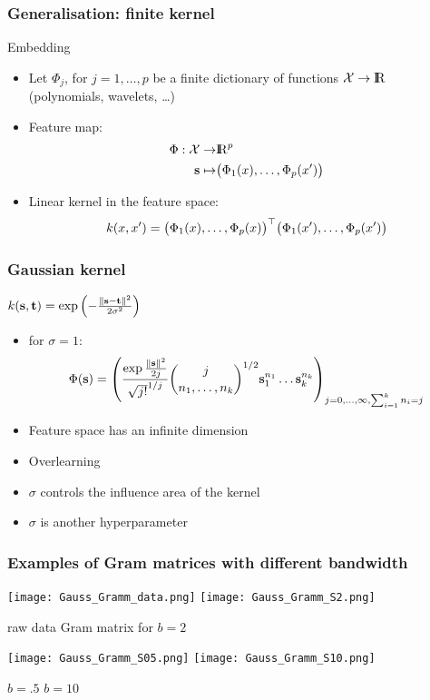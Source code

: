 \documentclass[11pt, pdf, compress, handout]{beamer}
\begin{document}
\begin{frame}
\frametitle{Generalisation: finite kernel}
\begin{block}{Embedding}
  \begin{itemize}
  \item Let $\Phi_j$, for $j= {1, \dots, p}$ be a finite dictionary of
    functions ${\mathcal{X}} \to {\mathrm{I\hskip-2.2pt R}}$  (polynomials, wavelets, \dots)
  \item Feature map: 
    \begin{align*}
      \Phi : {\mathcal{X}} \to & {\mathrm{I\hskip-2.2pt R}}^p \\
      {\mathbf{s}} \mapsto  & \bigl(\Phi_1({\mathnormal{x}}),\dots ,\Phi_p({\mathnormal{x}}')\bigr)
    \end{align*}
  \item  Linear kernel in the feature space:
    $$
    {\mathnormal{k}}({\mathnormal{x}},{\mathnormal{x}}') =  \bigl(\Phi_1({\mathnormal{x}}),\dots,\Phi_p({\mathnormal{x}})\bigr)^\top
    \bigl(\Phi_1({\mathnormal{x}}'),\dots ,\Phi_p({\mathnormal{x}}')\bigr)
    $$
  \end{itemize}
  
\end{block}

\end{frame}

\begin{frame}
  \frametitle{Gaussian kernel}
  \begin{block}{${\mathnormal{k}}({\mathbf{s}},{\mathbf{t}}) = \exp{\left(-\frac{\|{\mathbf{s}}- {\mathbf{t}}\|^2}{2\sigma^2}\right)}$}
    \begin{itemize}
    \item for $\sigma = 1$:
      $$\Phi({\mathbf{s}}) =
      \left(
      \frac{
        \exp \frac{\|{\mathbf{s}}\|^2}{2j}
           }{\sqrt{j!}^{1/j}} \binom{j}{n_1,
        \dots,n_k}^{1/2} {\mathbf{s}}_1^{n_1} \dots {\mathbf{s}}_k^{n_k}
    \right)_{j=0,\dots, \infty, \sum_{i=1}^k n_i = j}$$
  \item Feature space has an infinite dimension
  \item Overlearning \smalldanger
  \item $\sigma$ controls the influence area of the kernel
  \item $\sigma$ is another hyperparameter
    
  \end{itemize}
    
  \end{block}
\end{frame}

 \begin{frame}[plain]
 \frametitle{Examples of Gram matrices with different bandwidth}

\vspace{-.3cm}
\begin{center}
\texttt{[image: Gauss\_Gramm\_data.png]}
\texttt{[image: Gauss\_Gramm\_S2.png]}

\scriptsize \hfill raw data \hfill Gram matrix for $b = 2 \qquad \qquad \quad $  \hfill 

\texttt{[image: Gauss\_Gramm\_S05.png]}
\texttt{[image: Gauss\_Gramm\_S10.png]}

\scriptsize \hfill $b = .5$ \hfill $b = 10\qquad  \qquad  \qquad  \qquad $  \hfill 
\end{center}

 \end{frame} 
\end{document}

